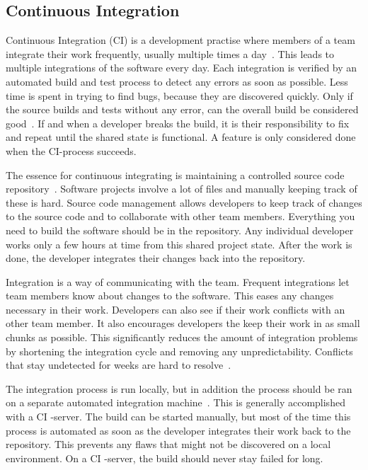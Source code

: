 \documentclass[english]{tktltiki2}
\begin{document}
\subsection{Continuous Integration}

Continuous Integration (CI) is a development practise where members of a team integrate their work frequently, usually multiple times a day~\cite{Fow06}. This leads to multiple integrations of the software every day. Each integration is verified by an automated build and test process to detect any errors as soon as possible. Less time is spent in trying to find bugs, because they are discovered quickly. Only if the source builds and tests without any error, can the overall build be considered good~\cite{Fow06}. If and when a developer breaks the build, it is their responsibility to fix and repeat until the shared state is functional. A feature is only considered done when the CI-process succeeds.

The essence for continuous integrating is maintaining a controlled source code repository~\cite{Fow06}. Software projects involve a lot of files and manually keeping track of these is hard. Source code management allows developers to keep track of changes to the source code and to collaborate with other team members. Everything you need to build the software should be in the repository. Any individual developer works only a few hours at time from this shared project state. After the work is done, the developer integrates their changes back into the repository.

Integration is a way of communicating with the team. Frequent integrations let team members know about changes to the software. This eases any changes necessary in their work. Developers can also see if their work conflicts with an other team member. It also encourages developers the keep their work in as small chunks as possible. This significantly reduces the amount of integration problems by shortening the integration cycle and removing any unpredictability. Conflicts that stay undetected for weeks are hard to resolve~\cite{Fow06}.

The integration process is run locally, but in addition the process should be ran on a separate automated integration machine~\cite{Fow06}. This is generally accomplished with a CI -server. The build can be started manually, but most of the time this process is automated as soon as the developer integrates their work back to the repository. This prevents any flaws that might not be discovered on a local environment. On a CI -server, the build should never stay failed for long.
\end{document}
